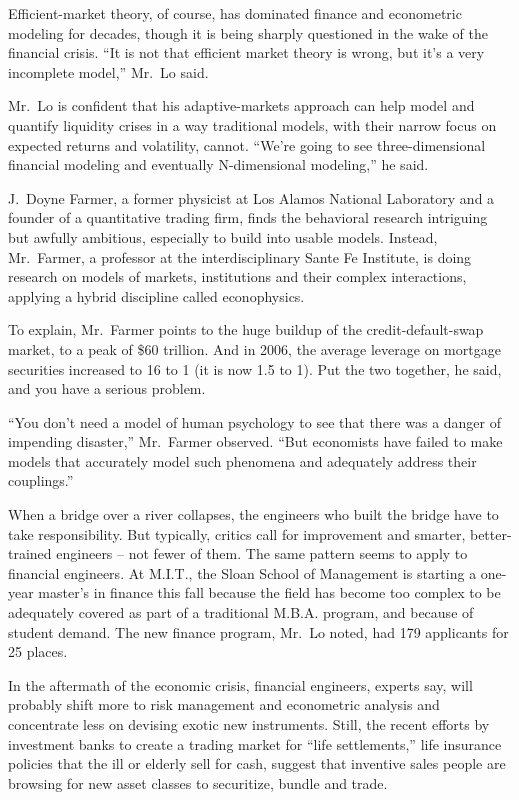﻿\documentclass[12pt]{article}
\begin{document}
Efficient-market theory, of course, has dominated finance and econometric modeling for decades,
though it is being sharply questioned in the wake of the financial crisis. ``It is not that
efficient market theory is wrong, but it's a very incomplete model,'' Mr.~Lo said.

Mr.~Lo is confident that his adaptive-markets approach can help model and quantify liquidity crises
in a way traditional models, with their narrow focus on expected returns and volatility, cannot.
``We're going to see three-dimensional financial modeling and eventually N-dimensional modeling,''
he said.

J.~Doyne Farmer, a former physicist at Los Alamos National Laboratory and a founder of a
quantitative trading firm, finds the behavioral research intriguing but awfully ambitious,
especially to build into usable models. Instead, Mr.~Farmer, a professor at the interdisciplinary
Sante Fe Institute, is doing research on models of markets, institutions and their complex
interactions, applying a hybrid discipline called econophysics.

To explain, Mr.~Farmer points to the huge buildup of the credit-default-swap market, to a peak of
\$60 trillion. And in 2006, the average leverage on mortgage securities increased to 16 to 1 (it is
now 1.5 to 1). Put the two together, he said, and you have a serious problem.

``You don't need a model of human psychology to see that there was a danger of impending disaster,''
Mr.~Farmer observed. ``But economists have failed to make models that accurately model such
phenomena and adequately address their couplings.''

When a bridge over a river collapses, the engineers who built the bridge have to take
responsibility. But typically, critics call for improvement and smarter, better-trained engineers --
not fewer of them. The same pattern seems to apply to financial engineers. At M.I.T., the Sloan
School of Management is starting a one-year master's in finance this fall because the field has
become too complex to be adequately covered as part of a traditional M.B.A. program, and because of
student demand. The new finance program, Mr.~Lo noted, had 179 applicants for 25 places.

In the aftermath of the economic crisis, financial engineers, experts say, will probably shift more
to risk management and econometric analysis and concentrate less on devising exotic new instruments.
Still, the recent efforts by investment banks to create a trading market for ``life settlements,''
life insurance policies that the ill or elderly sell for cash, suggest that inventive sales people
are browsing for new asset classes to securitize, bundle and trade.
\end{document}
